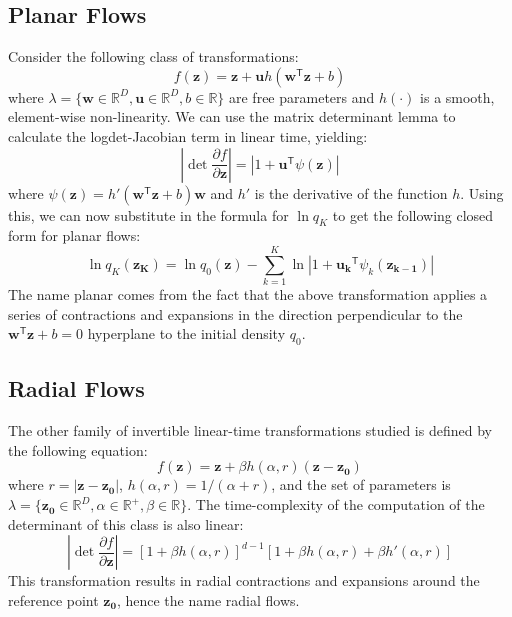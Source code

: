 \subsection{Planar Flows}
Consider the following class of transformations:
\begin{equation}
f(\mathbf{z}) = \mathbf{z}+\mathbf{u}h(\mathbf{w}^\mathsf{T}\mathbf{z}+b)
\end{equation}
where $\lambda = \{ \mathbf{w} \in \mathbb{R}^D, \mathbf{u} \in \mathbb{R}^D, b \in \mathbb{R} \}$ are free parameters and $h(\cdot)$ is a smooth, element-wise non-linearity. We can use the matrix determinant lemma to calculate the logdet-Jacobian term in linear time, yielding:
\begin{equation}
\left| \det \frac{\partial f}{\partial \mathbf{z}} \right| = \left| 1+\mathbf{u}^\mathsf{T}\psi(\mathbf{z})\right|
\end{equation}
where $\psi(\mathbf{z}) = h'(\mathbf{w}^\mathsf{T}\mathbf{z}+b)\mathbf{w}$ and $h'$ is the derivative of the function $h$. Using this, we can now substitute in the formula for $\ln q_K$ to get the following closed form for planar flows:
\begin{equation}
\ln q_K (\mathbf{z_K}) = \ln q_0(\mathbf{z}) - \sum_{k=1}^K \ln \left| 1+\mathbf{u_k}^\mathsf{T}\psi_k(\mathbf{z_{k-1}})\right|
\end{equation}
The name planar comes from the fact that the above transformation applies a series of contractions and expansions in the direction perpendicular to the $\mathbf{w}^\mathsf{T}\mathbf{z}+b = 0$ hyperplane to the initial density $q_0$.

\subsection{Radial Flows}
The other family of invertible linear-time transformations studied is defined by the following equation:
\begin{equation}
f(\mathbf{z}) = \mathbf{z} + \beta h(\alpha,r)(\mathbf{z}-\mathbf{z_0})
\end{equation}
where $r=\left| \mathbf{z}-\mathbf{z_0}\right|$, $h(\alpha,r) = 1/(\alpha+r)$, and the set of parameters is $\lambda = \{ \mathbf{z_0}\in \mathbb{R}^D, \alpha \in \mathbb{R} ^{+}, \beta \in \mathbb{R} \}$. The time-complexity of the computation of the determinant of this class is also linear:
\begin{equation}
\left| \det \frac{\partial f}{\partial \mathbf{z}} \right| = [1+\beta h(\alpha ,r)]^{d-1}[1+\beta h(\alpha ,r)+\beta h'(\alpha ,r)]
\end{equation}
This transformation results in radial contractions and expansions around the reference point $\mathbf{z_0}$, hence the name radial flows.


